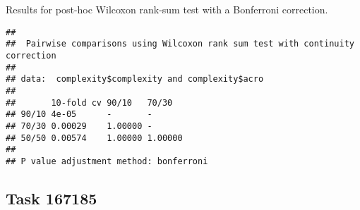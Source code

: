 \documentclass[
]{book}
\newenvironment{Shaded}{\begin{snugshade}}{\end{snugshade}}
\newcommand{\AttributeTok}[1]{\textcolor[rgb]{0.13,0.29,0.53}{#1}}
\newcommand{\ConstantTok}[1]{\textcolor[rgb]{0.56,0.35,0.01}{#1}}
\newcommand{\FunctionTok}[1]{\textcolor[rgb]{0.13,0.29,0.53}{\textbf{#1}}}
\newcommand{\NormalTok}[1]{#1}
\newcommand{\SpecialCharTok}[1]{\textcolor[rgb]{0.81,0.36,0.00}{\textbf{#1}}}
\newcommand{\StringTok}[1]{\textcolor[rgb]{0.31,0.60,0.02}{#1}}
\begin{document}
Results for post-hoc Wilcoxon rank-sum test with a Bonferroni correction.

\begin{Shaded}
\end{Shaded}

\begin{verbatim}
## 
##  Pairwise comparisons using Wilcoxon rank sum test with continuity correction 
## 
## data:  complexity$complexity and complexity$acro 
## 
##       10-fold cv 90/10   70/30  
## 90/10 4e-05      -       -      
## 70/30 0.00029    1.00000 -      
## 50/50 0.00574    1.00000 1.00000
## 
## P value adjustment method: bonferroni
\end{verbatim}

\hypertarget{task-167185-1}{%
\subsection{Task 167185}\label{task-167185-1}}
\end{document}
